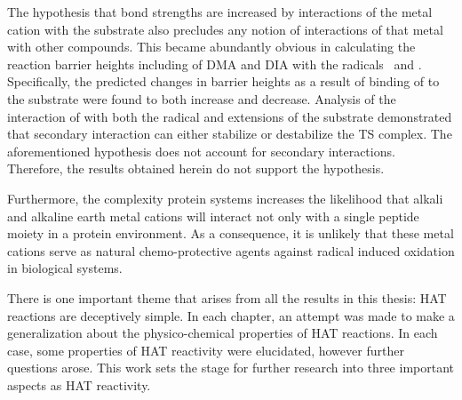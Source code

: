 \begin{doublespace}
The hypothesis that  bond strengths are increased by interactions of the
metal cation with the substrate also precludes any notion of interactions of
that metal with other compounds. This became abundantly obvious in calculating
the reaction barrier heights including  of DMA and DIA with the
radicals \cumo\ and \bno. Specifically, the predicted changes in barrier heights
as a result of binding of  to the substrate were found to both increase
and decrease. Analysis of the interaction of  with both the radical and
extensions of the substrate demonstrated that secondary interaction can either
stabilize or destabilize the TS complex. The aforementioned hypothesis does not
account for secondary interactions. Therefore, the results obtained herein do
not support the hypothesis.

Furthermore, the complexity protein systems increases the likelihood that alkali
and alkaline earth metal cations will interact not only with a single peptide
moiety in a protein environment. As a consequence, it is unlikely that these
metal cations serve as natural chemo-protective agents against radical induced
oxidation in biological systems.

There is one important theme that arises from all the results in this thesis:
HAT reactions are deceptively simple. In each chapter, an attempt was made to
make a generalization about the physico-chemical properties of HAT reactions. In
each case, some properties of HAT reactivity were elucidated, however further
questions arose. This work sets the stage for further research into three
important aspects as HAT reactivity. 


\end{doublespace}
